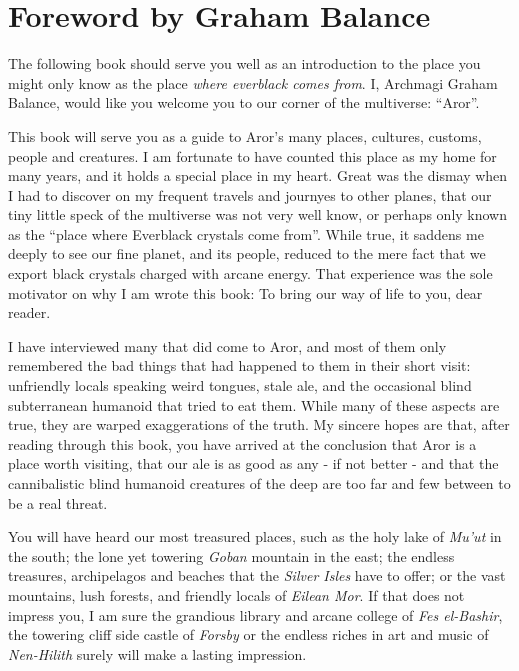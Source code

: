 \pagebreak

\onecolumn
\section{Foreword by Graham Balance}

The following book should serve you well as an introduction to the
place you might only know as the place \emph{where everblack comes
  from}. I, Archmagi Graham Balance, would like you welcome you to
our corner of the multiverse: ``Aror''.

This book will serve you as a guide to Aror's many places, cultures,
customs, people and creatures. I am fortunate to have counted this
place as my home for many years, and it holds a special place in my
heart. Great was the dismay when I had to discover on my frequent
travels and journyes to other planes, that our tiny little speck of
the multiverse was not very well know, or perhaps only known as the
``place where Everblack crystals come from''. While true, it saddens
me deeply to see our fine planet, and its people, reduced to the mere
fact that we export black crystals charged with arcane energy. That
experience was the sole motivator on why I am wrote this book: To bring
our way of life to you, dear reader.

I have interviewed many that did come to Aror, and most of them only
remembered the bad things that had happened to them in their short
visit: unfriendly locals speaking weird tongues, stale ale, and the
occasional blind subterranean humanoid that tried to eat them. While
many of these aspects are true, they are warped exaggerations of the
truth. My sincere hopes are that, after reading through this book, you
have arrived at the conclusion that Aror is a place worth visiting,
that our ale is as good as any - if not better - and that the
cannibalistic blind humanoid creatures of the deep are too far and few
between to be a real threat.

You will have heard our most treasured places, such as the holy lake of
\emph{Mu'ut} in the south; the lone yet towering \emph{Goban} mountain in the
east; the endless treasures, archipelagos and beaches that the \emph{Silver
  Isles} have to offer; or the vast mountains, lush forests, and friendly
locals of \emph{Eilean Mor}. If that does not impress you, I am sure the
grandious library and arcane college of \emph{Fes el-Bashir}, the towering
cliff side castle of \emph{Forsby} or the endless riches in art and music of
\emph{Nen-Hilith} surely will make a lasting impression.

